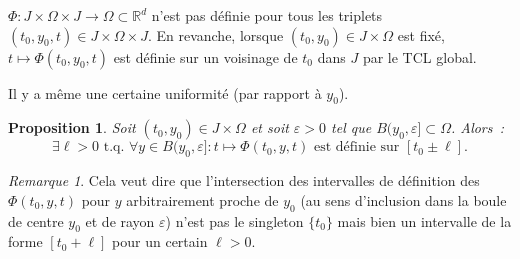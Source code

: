 \documentclass{report}
\newtheorem{prp}[thm]{Proposition}
\theoremstyle{definition}
\theoremstyle{remark}
\newtheorem*{rmq}{Remarque}
\numberwithin{equation}{section}
\newcommand{\R}{\mathbb R}
\newcommand{\tq}{\text{ t.q. }}
\begin{document}
			$\Phi : J \times \Omega \times J \to \Omega \subset \R^d$ n'est pas définie pour tous les triplets $(t_0, y_0, t) \in J \times \Omega \times J$.
			En revanche, lorsque $(t_0, y_0) \in J \times \Omega$ est fixé, $t \mapsto \Phi(t_0, y_0, t)$ est définie sur un voisinage de $t_0$ dans $J$
			par le TCL global.

			Il y a même une certaine uniformité (par rapport à $y_0$).

			\begin{prp} Soit $(t_0, y_0) \in J \times \Omega$ et soit $\varepsilon > 0$ tel que $B(y_0, \varepsilon] \subset \Omega$. Alors~:
			\begin{equation}
				\exists \ell > 0 \tq \forall y \in B(y_0, \varepsilon] : t \mapsto \Phi(t_0, y, t) \text{ est définie sur } [t_0 \pm \ell].
			\end{equation}
			\end{prp}

			\begin{rmq} Cela veut dire que l'intersection des intervalles de définition des $\Phi(t_0, y, t)$ pour $y$ arbitrairement proche de $y_0$ (au sens
			d'inclusion dans la boule de centre $y_0$ et de rayon $\varepsilon$) n'est pas le singleton $\{t_0\}$ mais bien un intervalle de la forme $[t_0+\ell]$
			pour un certain $\ell > 0$.
			\end{rmq}
\end{document}
